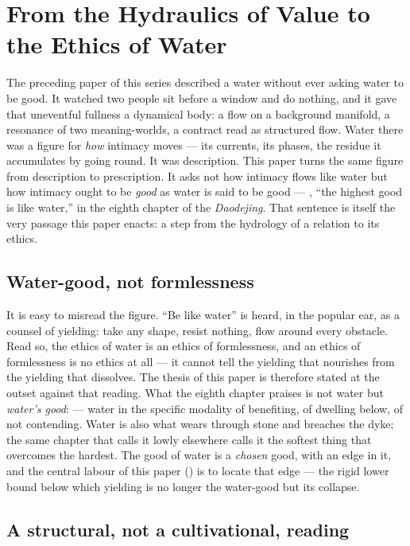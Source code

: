 \section{From the Hydraulics of Value to the Ethics of Water}
\label{p20:sec:intro}

\noindent
The preceding paper of this series \parencite{paperxix} described a water without ever asking water to be good. It watched two people sit before a window and do nothing, and it gave that uneventful fullness a dynamical body: a flow on a background manifold, a resonance of two meaning-worlds, a contract read as structured flow. Water there was a figure for \emph{how} intimacy moves --- its currents, its phases, the residue it accumulates by going round. It was description. This paper turns the same figure from description to prescription. It asks not how intimacy flows like water but how intimacy ought to be \emph{good} as water is said to be good --- , ``the highest good is like water,'' in the eighth chapter of the \emph{Daodejing}. That sentence is itself the very passage this paper enacts: a step from the hydrology of a relation to its ethics.

\subsection{Water-good, not formlessness}
\label{p20:sub:intro-thesis}

It is easy to misread the figure. ``Be like water'' is heard, in the popular ear, as a counsel of yielding: take any shape, resist nothing, flow around every obstacle. Read so, the ethics of water is an ethics of formlessness, and an ethics of formlessness is no ethics at all --- it cannot tell the yielding that nourishes from the yielding that dissolves. The thesis of this paper is therefore stated at the outset against that reading. What the eighth chapter praises is not water but \emph{water's good}:  --- water in the specific modality of benefiting, of dwelling below, of not contending. Water is also what wears through stone and breaches the dyke; the same chapter that calls it lowly elsewhere calls it the softest thing that overcomes the hardest. The good of water is a \emph{chosen} good, with an edge in it, and the central labour of this paper () is to locate that edge --- the rigid lower bound below which yielding is no longer the water-good but its collapse.

\subsection{A structural, not a cultivational, reading}
\label{p20:sub:intro-structural}

